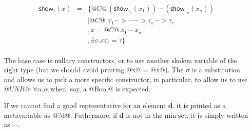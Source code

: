 \[\begin{array}{rcl}
\mathsf{show}_{\tau}(x)
    & = & \{ @C@ \, (\mathsf{show}_{\tau_1}(x_1)) \, \cdots \, (\mathsf{show}_{\tau_n}(x_n)) \\
    &   & \mid @C@ : \tau_1 -> \cdots -> \tau_n -> \tau_r \\
    &   & , x = @C@ \, x_1 \, \cdots \, x_n \\
    &   & , \exists \sigma . \sigma\tau_r = \tau \} \\
\end{array}\]

The base case is nullary constructors, or to use another skolem
variable of the right type (but we should avoid printing @x@ = @x@).
The $\sigma$ is a substitution and allows us to pick a more specific
constructor, in particular, to allow us to use
$@UNR@ : \forall \alpha . \alpha$ when, say, a @Bool@ is expected.

If we cannot find a good representative for an element $\mathbf{d}$,
it is printed as a metavariable as @?d@. Futhermore, if $\mathbf{d}$
is not in the min set, it is simply written as $\cdots$.


